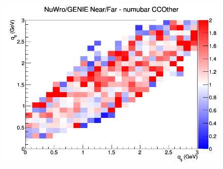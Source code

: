 \begin{figure}[h]
\endminipage
{}
\includegraphics[width=\linewidth]{eff_q0_q3/GAr/ratios/CCOther_NuWro_GENIE_numubar_NF_q3_q0.png}
\endminipage
\newline
\end{figure}
\clearpage
